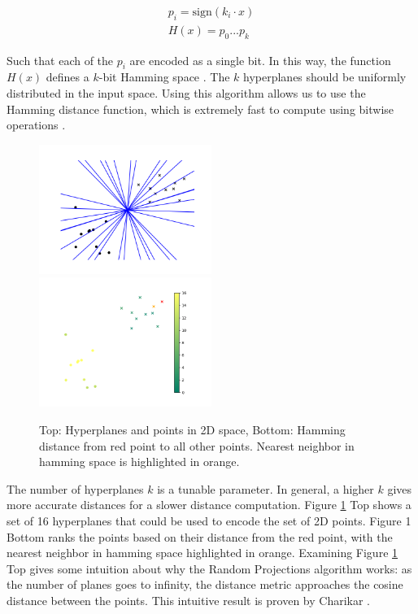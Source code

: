 \begin{align}
    p_i = \text{sign}(k_i \cdot x) \\
    H(x) = p_0...p_k
\end{align}

Such that each of the $p_i$ are encoded as a single bit. In this way, the function $H(x)$ defines a $k$-bit Hamming space \cite{hamming1950error}. The $k$ hyperplanes should be uniformly distributed in the input space. Using this algorithm allows us to use the Hamming distance function, which is extremely fast to compute using bitwise operations \cite{cohen1997covering}.

\begin{figure}[h]
    \includegraphics[width=0.5\textwidth]{images/lsh_planes.png}
    \includegraphics[width=0.5\textwidth]{images/lsh_distance.png}
    \caption{Top: Hyperplanes and points in 2D space, Bottom: Hamming distance from red point to all other points. Nearest neighbor in hamming space is highlighted in orange.}
    \label{fig:lsh}
\end{figure}

The number of hyperplanes $k$ is a tunable parameter. In general, a higher $k$ gives more accurate distances for a slower distance computation. Figure \ref{fig:lsh} Top shows a set of 16 hyperplanes that could be used to encode the set of 2D points. Figure 1 Bottom ranks the points based on their distance from the red point, with the nearest neighbor in hamming space highlighted in orange. Examining Figure \ref{fig:lsh} Top gives some intuition about why the Random Projections algorithm works: as the number of planes goes to infinity, the distance metric approaches the cosine distance between the points. This intuitive result is proven by Charikar \cite{charikar2002similarity}.

